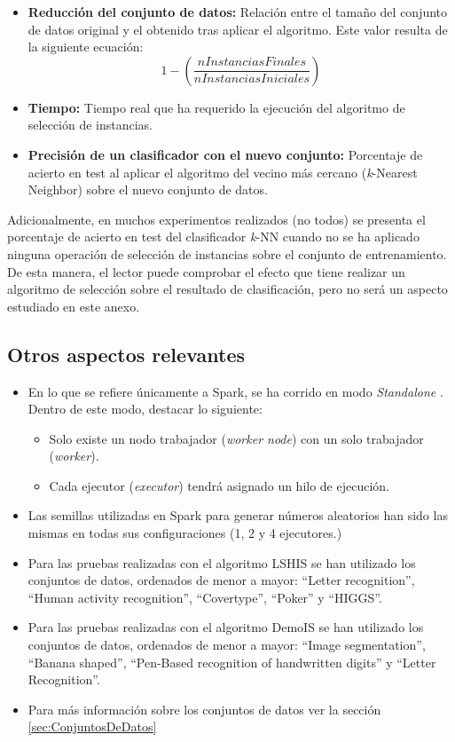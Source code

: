 \begin{itemize}
	\item \textbf{Reducción del conjunto de datos:} Relación entre el tamaño del conjunto de datos original y el obtenido tras aplicar el algoritmo. Este valor resulta de la siguiente ecuación: \[1-(\frac{nInstanciasFinales}{nInstanciasIniciales})\]

	\item \textbf{Tiempo:} Tiempo real que ha requerido la ejecución del algoritmo de selección de instancias.
	\item \textbf{Precisión de un clasificador con el nuevo conjunto:} Porcentaje de acierto en test al aplicar el algoritmo del vecino más cercano (\textit{k}-Nearest Neighbor) sobre el nuevo conjunto de datos.
\end{itemize}

Adicionalmente, en muchos experimentos realizados (no todos) se presenta el porcentaje de acierto en test del clasificador \textit{k}-NN cuando no se ha aplicado ninguna operación de selección de instancias sobre el conjunto de entrenamiento. De esta manera, el lector puede comprobar el efecto que tiene realizar un algoritmo de selección sobre el resultado de clasificación, pero no será un aspecto estudiado en este anexo.

\subsection{Otros aspectos relevantes}\label{subsec:otrosLSHISyDemoIS}
 \begin{itemize}
	\item En lo que se refiere únicamente a Spark, se ha corrido en modo \textit{Standalone} \cite{StandaloneSpark}. Dentro de este modo, destacar lo siguiente:
	\begin{itemize}
		\item Solo existe un nodo trabajador (\textit{worker node}) con un solo trabajador (\textit{worker}).
		\item Cada ejecutor (\textit{executor}) tendrá asignado un hilo de ejecución.
	\end{itemize}
	\item Las semillas utilizadas en Spark para generar números aleatorios han sido las mismas en todas sus configuraciones (1, 2 y 4 ejecutores.)
	\item Para las pruebas realizadas con el algoritmo LSHIS se han utilizado los conjuntos de datos, ordenados de menor a mayor: ``Letter recognition'', ``Human activity recognition'', ``Covertype'', ``Poker'' y ``HIGGS''.
	\item Para las pruebas realizadas con el algoritmo DemoIS se han utilizado los conjuntos de datos, ordenados de menor a mayor:  ``Image segmentation'', ``Banana shaped'', ``Pen-Based recognition of handwritten digits'' y ``Letter Recognition''.
	\item Para más información sobre los conjuntos de datos ver la sección \ref{sec:ConjuntosDeDatos}
 \end{itemize}

